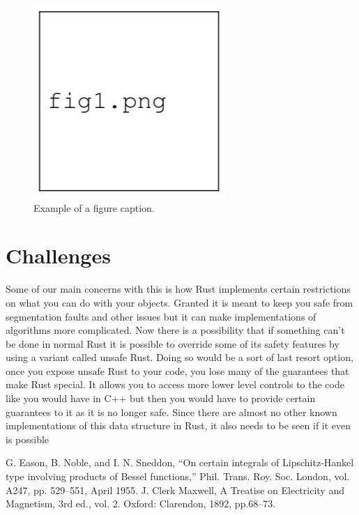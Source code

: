 \documentclass[conference]{IEEEtran}
\begin{document}
\begin{figure}[htbp]
\centerline{\includegraphics{fig1.png}}
\caption{Example of a figure caption.}
\label{fig}
\end{figure}

\section{Challenges}

Some of our main concerns with this is how Rust implements certain restrictions on what you can do with your objects. Granted it is meant to keep you safe from segmentation faults and other issues but it can make implementations of algorithms more complicated. Now there is a possibility that if something can’t be done in normal Rust it is possible to override some of its safety features by using a variant called unsafe Rust. Doing so would be a sort of last resort option, once you expose unsafe Rust to your code, you lose many of the guarantees that make Rust special. It allows you to access more lower level controls to the code like you would have in C++ but then you would have to provide certain guarantees to it as it is no longer safe. 
Since there are almost no other known implementations of this data structure in Rust, it also needs to be seen if it even is possible

\begin{thebibliography}{00}


 G. Eason, B. Noble, and I. N. Sneddon, ``On certain integrals of Lipschitz-Hankel type involving products of Bessel functions,'' Phil. Trans. Roy. Soc. London, vol. A247, pp. 529--551, April 1955.
 J. Clerk Maxwell, A Treatise on Electricity and Magnetism, 3rd ed., vol. 2. Oxford: Clarendon, 1892, pp.68--73.
\end{thebibliography}
\end{document}
